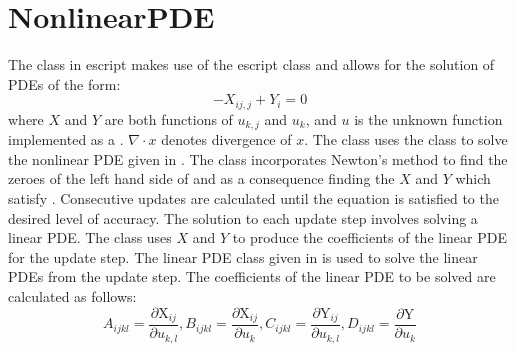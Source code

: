 \pagebreak
\section{NonlinearPDE}
The \NLPDE class in escript makes use of the escript \SYMBOL class and allows
for the solution of PDEs of the form:
\begin{equation}
-X_{ij,j} + Y_i = 0
\label{symbolic eq1}
\end{equation}
where $X$ and $Y$ are both functions of $u_{k,j}$ and $u_k$, and $u$ is the
unknown function implemented as a \SYMBOL. $\nabla\cdotp x$ denotes divergence
of $x$.
The \NLPDE class uses the \SYMBOL class to solve the nonlinear PDE given in
.
The class incorporates Newton's method to find the zeroes of the left hand side
of  and as a consequence finding the $X$ and $Y$ which
satisfy . 
Consecutive updates are calculated until the equation is satisfied to the
desired level of accuracy. The solution to each update step involves solving a
linear PDE. The \NLPDE class uses $X$ and $Y$ to produce the coefficients of
the linear PDE for the update step. The linear PDE class given in
 is used to solve the linear PDEs from the update step.
The coefficients of the linear PDE to be solved are calculated as follows: 
\begin{equation*}
 A_{ijkl} = \frac{\partial \text{X}_{ij}}{\partial u_{k,l}}, B_{ijkl} = \frac{\partial \text{X}_{ij}}{\partial u_{k}}, C_{ijkl} = \frac{\partial \text{Y}_{ij}}{\partial u_{k,l}}, D_{ijkl} = \frac{\partial \text{Y}}{\partial u_{k}}
\end{equation*}
